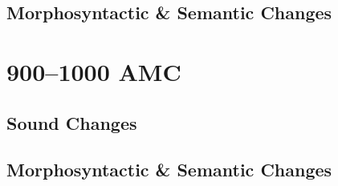 \documentclass[a4paper,11pt,twoside,openany]{memoir}
\begin{document}
\subsection{Morphosyntactic \& Semantic Changes}


\section{900--1000 AMC}

\subsection{Sound Changes}


\subsection{Morphosyntactic \& Semantic Changes}

\end{document}
